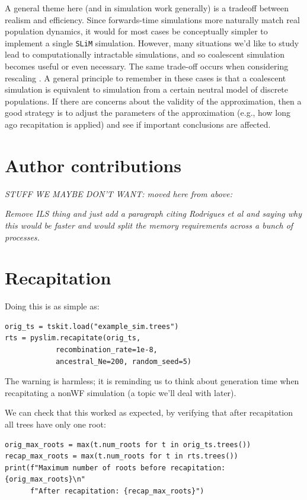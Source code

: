 \documentclass[12pt]{article}
\newcommand{\slim}[0]{\texttt{SLiM}\xspace}
\newcommand{\comment}[1]{\textit{\color{green} #1}}
\begin{document}
A general theme here (and in simulation work generally)
is a tradeoff between realism and efficiency.
Since forwards-time simulations more naturally match real population dynamics,
it would for most cases be conceptually simpler to implement a single \slim simulation.
However, many situations we'd like to study lead to computationally intractable simulations,
and so coalescent simulation becomes useful or even necessary.
The same trade-off occurs when considering rescaling \citep{cury_simulation_2022,dabi_population_2025}.
A general principle to remember in these cases is that a coalescent simulation is equivalent
to simulation from a certain neutral model of discrete populations.
If there are concerns about the validity of the approximation,
then a good strategy is to adjust the parameters of the approximation (e.g., how long ago recapitation is applied)
and see if important conclusions are affected.


\section*{Author contributions}




\newpage
\appendix

\comment{STUFF WE MAYBE DON'T WANT: moved here from above:}

\comment{Remove ILS thing and just add a paragraph citing Rodrigues et al and saying why this would be faster and would split the memory requirements across a bunch of processes.}

\section{Recapitation}


Doing this is as simple as:

\begin{verbatim}
orig_ts = tskit.load("example_sim.trees")
rts = pyslim.recapitate(orig_ts,
            recombination_rate=1e-8,
            ancestral_Ne=200, random_seed=5)
\end{verbatim}
The warning is harmless; it is reminding us to think about generation time
when recapitating a nonWF simulation (a topic we'll deal with later).

We can check that this worked as expected, by verifying that after recapitation
all trees have only one root:
\begin{verbatim}
orig_max_roots = max(t.num_roots for t in orig_ts.trees())
recap_max_roots = max(t.num_roots for t in rts.trees())
print(f"Maximum number of roots before recapitation: {orig_max_roots}\n"
      f"After recapitation: {recap_max_roots}")
\end{verbatim}
\end{document}
